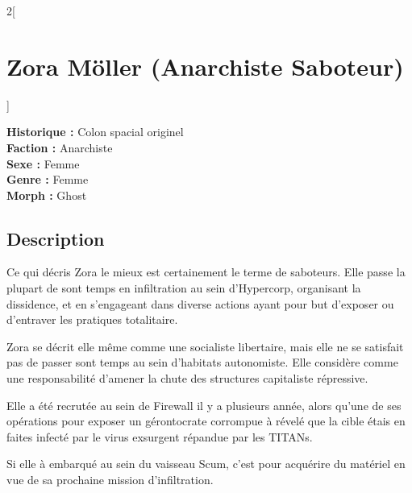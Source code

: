 \documentclass[a4paper,9pt]{article}
\begin{document}
\begin{multicols}{2}[\section*{Zora Möller (Anarchiste Saboteur)}]

   \noindent\textbf{Historique :} Colon spacial originel\\
   \noindent\textbf{Faction :} Anarchiste\\
   \noindent\textbf{Sexe :} Femme\\
   \noindent\textbf{Genre :} Femme\\
   \noindent\textbf{Morph :} Ghost\\

   \subsection*{Description}

   Ce qui décris Zora le mieux est certainement le terme de saboteurs.
   Elle passe la plupart de sont temps en infiltration au sein d'Hypercorp,
   organisant la dissidence, et en s'engageant dans diverse actions ayant pour but
   d'exposer ou d'entraver les pratiques totalitaire.

   Zora se décrit elle même comme une socialiste libertaire, mais elle ne se satisfait
   pas de passer sont temps au sein d'habitats autonomiste.
   Elle considère comme une responsabilité d'amener la chute des structures capitaliste
   répressive.

   Elle a été recrutée au sein de Firewall il y a plusieurs année, alors qu'une de
   ses opérations pour exposer un gérontocrate corrompue à révelé que la cible étais en 
   faites infecté par le virus exsurgent répandue par les TITANs.

   Si elle à embarqué au sein du vaisseau Scum, c'est pour acquérire du
   matériel en vue de sa prochaine mission d'infiltration.


\end{multicols}
\end{document}
